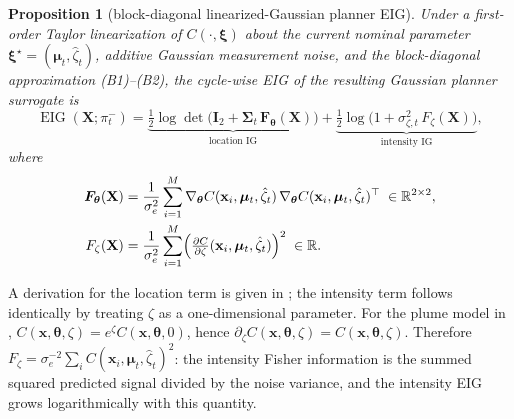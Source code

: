 \documentclass{article}
\newcommand{\R}{\mathbb{R}}
\newcommand{\bs}[1]{\boldsymbol{#1}}
\newcommand{\x}{\mathbf{x}}
\newcommand{\bX}{\mathbf{X}}
\newtheorem{proposition}{Proposition}
\begin{document}
\begin{proposition}[block-diagonal linearized-Gaussian planner EIG]
\label{prop:eig}
Under a first-order Taylor linearization of $C(\cdot,\bs\xi)$ about the current nominal parameter $\bs\xi^\star=(\bs\mu_t,\hat\zeta_t)$, additive Gaussian measurement noise, and the block-diagonal approximation (B1)--(B2), the cycle-wise EIG of the resulting Gaussian planner surrogate is
\begin{equation}
\label{eq:eig_formula}
\operatorname{EIG}(\bX;\pi_t^-)
=\underbrace{\tfrac12\log\det\!\bigl(\bs I_2+\bs\Sigma_t\,\bs F_{\bs\theta}(\bX)\bigr)}_{\text{location IG}}
+\underbrace{\tfrac12\log\bigl(1+\sigma_{\zeta,t}^2\,F_\zeta(\bX)\bigr)}_{\text{intensity IG}},
\end{equation}
where
\begin{align}
\bs F_{\bs\theta}(\bX)
&=\frac{1}{\sigma_e^2}\sum_{i=1}^M
\nabla_{\bs\theta}C(\x_i,\bs\mu_t,\hat\zeta_t)\,
\nabla_{\bs\theta}C(\x_i,\bs\mu_t,\hat\zeta_t)^\top
\;\in\R^{2\times2},
\label{eq:fisher_theta}\\
F_\zeta(\bX)
&=\frac{1}{\sigma_e^2}\sum_{i=1}^M
\Bigl(\tfrac{\partial C}{\partial\zeta}(\x_i,\bs\mu_t,\hat\zeta_t)\Bigr)^2
\;\in\R.
\label{eq:fisher_zeta}
\end{align}
\end{proposition}
\noindent A derivation for the location term is given in ; the intensity term follows identically by treating $\zeta$ as a one-dimensional parameter.
For the plume model in , $C(\x,\bs\theta,\zeta)=e^\zeta C(\x,\bs\theta,0)$, hence $\partial_\zeta C(\x,\bs\theta,\zeta)=C(\x,\bs\theta,\zeta)$.
Therefore $F_\zeta = \sigma_e^{-2}\sum_i C(\x_i,\bs\mu_t,\hat\zeta_t)^2$: the intensity Fisher information is the summed squared predicted signal divided by the noise variance, and the intensity EIG grows logarithmically with this quantity.
\end{document}

